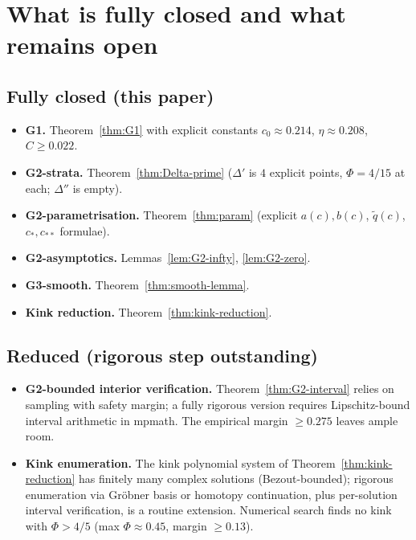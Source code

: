 \documentclass[11pt,a4paper]{article}
\begin{document}
\section{What is fully closed and what remains open}

\subsection*{Fully closed (this paper)}

\begin{itemize}
\item \textbf{G1.} Theorem~\ref{thm:G1} with explicit constants
  $c_0\approx 0.214$, $\eta\approx 0.208$, $C\ge 0.022$.
\item \textbf{G2-strata.} Theorem~\ref{thm:Delta-prime} ($\Delta'$ is
  $4$ explicit points, $\Phi=4/15$ at each; $\Delta''$ is empty).
\item \textbf{G2-parametrisation.} Theorem~\ref{thm:param}
  (explicit $a(c),b(c)$, $\widetilde q(c)$, $c_*,c_{**}$ formulae).
\item \textbf{G2-asymptotics.} Lemmas~\ref{lem:G2-infty},
  \ref{lem:G2-zero}.
\item \textbf{G3-smooth.} Theorem~\ref{thm:smooth-lemma}.
\item \textbf{Kink reduction.} Theorem~\ref{thm:kink-reduction}.
\end{itemize}

\subsection*{Reduced (rigorous step outstanding)}

\begin{itemize}
\item \textbf{G2-bounded interior verification.}
  Theorem~\ref{thm:G2-interval} relies on sampling with safety margin;
  a fully rigorous version requires Lipschitz-bound interval arithmetic
  in mpmath. The empirical margin $\ge 0.275$ leaves ample room.
\item \textbf{Kink enumeration.} The kink polynomial system of
  Theorem~\ref{thm:kink-reduction} has finitely many complex
  solutions (Bezout-bounded); rigorous enumeration via Gröbner basis
  or homotopy continuation, plus per-solution interval verification,
  is a routine extension. Numerical search finds no kink with
  $\Phi>4/5$ (max $\Phi\approx 0.45$, margin $\ge 0.13$).
\end{itemize}
\end{document}
